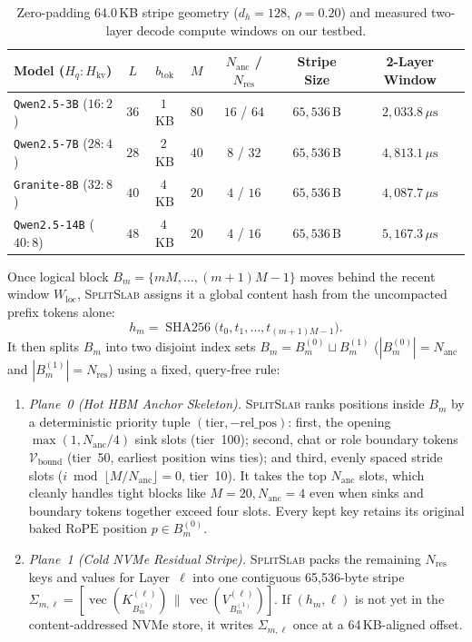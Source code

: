 \documentclass[pdflatex,sn-mathphys-num]{sn-jnl}
\theoremstyle{thmstyleone}
\newcommand{\SplitSlab}{\textsc{SplitSlab}}
\newcommand{\RoPE}{\mathrm{RoPE}}
\begin{document}
\begin{table}[t]
\centering
\caption{Zero-padding 64.0\,KB stripe geometry ($d_h = 128$, $\rho = 0.20$) and measured two-layer decode compute windows on our testbed.}
\label{tab:geometry}
\footnotesize
\renewcommand{\arraystretch}{1.15}
\setlength{\tabcolsep}{6pt}
\begin{tabular}{@{}lcccccc@{}}
\toprule
\textbf{Model ($H_q{:}H_{\mathrm{kv}}$)} & $L$ & $b_{\mathrm{tok}}$ & $M$ & $N_{\mathrm{anc}}$ / $N_{\mathrm{res}}$ & \textbf{Stripe Size} & \textbf{2-Layer Window} \\
\midrule
\texttt{Qwen2.5-3B} ($16{:}2$) & $36$ & $1$\,KB & $80$ & $16$ / $64$ & $65{,}536$\,B & $2{,}033.8\,\mu\mathrm{s}$ \\
\texttt{Qwen2.5-7B} ($28{:}4$) & $28$ & $2$\,KB & $40$ & $8$ / $32$ & $65{,}536$\,B & $4{,}813.1\,\mu\mathrm{s}$ \\
\texttt{Granite-8B} ($32{:}8$) & $40$ & $4$\,KB & $20$ & $4$ / $16$ & $65{,}536$\,B & $4{,}087.7\,\mu\mathrm{s}$ \\
\texttt{Qwen2.5-14B} ($40{:}8$) & $48$ & $4$\,KB & $20$ & $4$ / $16$ & $65{,}536$\,B & $5{,}167.3\,\mu\mathrm{s}$ \\
\bottomrule
\end{tabular}
\end{table}

Once logical block $B_m = \{mM, \dots, (m+1)M - 1\}$ moves behind the recent window $W_{\mathrm{loc}}$, \SplitSlab{} assigns it a global content hash from the uncompacted prefix tokens alone:
\begin{equation}\label{eq:canon_hash}
h_m = \operatorname{SHA256}\!\big(t_0, t_1, \dots, t_{(m+1)M-1}\big).
\end{equation}
It then splits $B_m$ into two disjoint index sets $B_m = B_m^{(0)} \sqcup B_m^{(1)}$ ($|B_m^{(0)}| = N_{\mathrm{anc}}$ and $|B_m^{(1)}| = N_{\mathrm{res}}$) using a fixed, query-free rule:
\begin{enumerate}
  \item \emph{Plane~0 (Hot HBM Anchor Skeleton).} \SplitSlab{} ranks positions inside $B_m$ by a deterministic priority tuple $(\text{tier}, -\text{rel\_pos})$: first, the opening $\max(1, N_{\mathrm{anc}}/4)$ sink slots (tier~100); second, chat or role boundary tokens $\mathcal{V}_{\mathrm{bound}}$ (tier~50, earliest position wins ties); and third, evenly spaced stride slots ($i \bmod \lfloor M/N_{\mathrm{anc}} \rfloor = 0$, tier~10). It takes the top $N_{\mathrm{anc}}$ slots, which cleanly handles tight blocks like $M = 20, N_{\mathrm{anc}} = 4$ even when sinks and boundary tokens together exceed four slots. Every kept key retains its original baked $\RoPE$ position $p \in B_m^{(0)}$.
  \item \emph{Plane~1 (Cold NVMe Residual Stripe).} \SplitSlab{} packs the remaining $N_{\mathrm{res}}$ keys and values for Layer~$\ell$ into one contiguous 65,536-byte stripe $\Sigma_{m,\ell} = [\operatorname{vec}(K_{B_m^{(1)}}^{(\ell)}) \,\|\, \operatorname{vec}(V_{B_m^{(1)}}^{(\ell)})]$. If $(h_m, \ell)$ is not yet in the content-addressed NVMe store, it writes $\Sigma_{m,\ell}$ once at a 64\,KB-aligned offset.
\end{enumerate}
\end{document}
